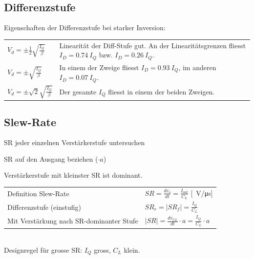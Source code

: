\subsection{Differenzstufe}
Eigenschaften der Differenzstufe bei starker Inversion:\\
\begin{tabular}{ll}
	$V_d = \pm \frac{1}{2}\sqrt{\frac{I_Q}{\beta}}$& Linearität der Diff-Stufe gut. An der Linearitätsgrenzen fliesst $I_D = \SI{0.74}{I_Q}$ bzw. $I_D = \SI{0.26}{I_Q}$.\\
	$V_d = \pm\sqrt{\frac{I_Q}{\beta}}$& In einem der Zweige fliesst $I_D = \SI{0.93}{I_Q}$, im anderen $I_D = \SI{0.07}{I_Q}$.\\
	$V_d = \pm\sqrt{2}\sqrt{\frac{I_Q}{\beta}}$& Der gesamte $I_Q$ fliesst in einem der beiden Zweigen.
\end{tabular}

\subsection{Slew-Rate}
\begin{compactenum}
	\item SR jeder einzelnen Verstärkerstufe untersuchen
	\item SR auf den Ausgang beziehen ($\cdot a$)
	\item Verstärkerstufe mit kleinster SR ist dominant.
\end{compactenum}
	\begin{tabular}{ll}
		Definition Slew-Rate&$SR=\frac{dv_o}{dt}=\frac{I_{out}}{C_L}$ [\SI{}{\volt/\micro\second}]\\
		Differenzstufe (einstufig)& $SR_r = |SR_f|=\frac{I_Q}{C_L}$\\
		Mit Verstärkung nach SR-dominanter Stufe&$|SR|=\frac{dv_{CL}}{dt}\cdot a= \frac{I_Q}{C_L}\cdot a$
	\end{tabular}\\[1ex]
	Designregel für grosse SR: $I_Q$ gross, $C_L$ klein.


